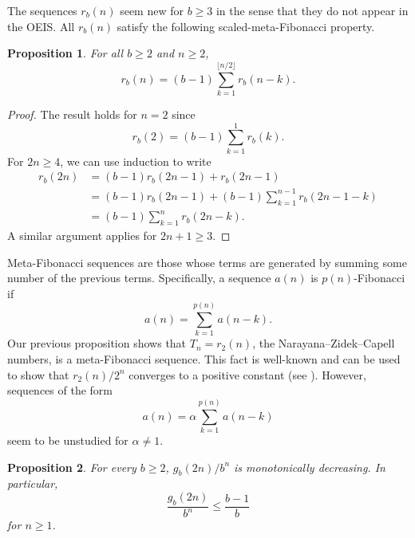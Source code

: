 \documentclass[12pt]{amsart}
\newtheorem{proposition}{Proposition}
\theoremstyle{definition}
\begin{document}
The sequences $r_b(n)$ seem new for $b \geq 3$ in the sense that they do not
appear in the OEIS. All $r_b(n)$ satisfy the following scaled-meta-Fibonacci
property.

\begin{proposition}
    For all $b \geq 2$ and $n \geq 2$,
    \begin{equation*}
        r_b(n) = (b - 1) \sum_{k = 1}^{\lfloor n / 2 \rfloor} r_b(n - k).
    \end{equation*}
\end{proposition}

\begin{proof}
    The result holds for $n = 2$ since
    \begin{equation*}
        r_b(2) = (b - 1) \sum_{k = 1}^1 r_b(k).
    \end{equation*}
    For $2n \geq 4$, we can use induction to write
    \begin{align*}
        r_b(2n) &= (b - 1) r_b(2n - 1) + r_b(2n - 1) \\
                &= (b - 1) r_b(2n - 1) + (b - 1) \sum_{k = 1}^{n - 1} r_b(2n - 1 - k) \\
                &= (b - 1) \sum_{k = 1}^n r_b(2n - k).
    \end{align*}
    A similar argument applies for $2n + 1 \geq 3$.
\end{proof}

Meta-Fibonacci sequences are those whose terms are generated by summing some
number of the previous terms. Specifically, a sequence $a(n)$ is
$p(n)$-Fibonacci if
\begin{equation*}
    a(n) = \sum_{k = 1}^{p(n)} a(n - k).
\end{equation*}
Our previous proposition shows that $T_n = r_2(n)$, the Narayana--Zidek--Capell
numbers, is a meta-Fibonacci sequence. This fact is well-known and can be used
to show that $r_2(n) / 2^n$ converges to a positive constant (see
\cite{emerson2006family}). However, sequences of the form
\begin{equation*}
    a(n) = \alpha \sum_{k = 1}^{p(n)} a(n - k)
\end{equation*}
seem to be unstudied for $\alpha \neq 1$.

\begin{proposition}
    For every $b \geq 2$, $g_b(2n) / b^n$ is monotonically decreasing. In
    particular,
    \begin{equation*}
        \frac{g_b(2n)}{b^n} \leq \frac{b - 1}{b}
    \end{equation*}
    for $n \geq 1$.
\end{proposition}
\end{document}
